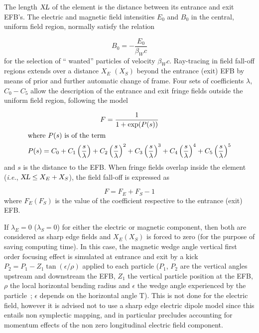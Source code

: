 \noindent The length $ \textsl{XL} $ of the element is the distance between its
entrance and exit EFB's. The electric and magnetic field intensities $ E_0 $ and $ B_0 $ in the 
central, uniform field region, normally satisfy the relation
 
 $$ B_0= - \dfrac{E_0 }{ \beta_ Wc} $$
%
 for the selection of `` wanted''  particles of velocity $\beta_Wc $. Ray-tracing in 
field fall-off regions extends over a distance $ X_E $ $ (X_S) $ beyond the
entrance (exit) EFB by means of prior and further automatic change of frame. Four sets
of coefficients $\lambda$, $ C_0-C_5 $ allow the description of the entrance and exit fringe 
fields outside the uniform field region, following the model~\cite{Biblio12} %

\begin{gather*}
	F = \dfrac{1 }{ 1+ \exp(P(s))} \\
	\intertext{where $  P(s) $ is of the term}
	    P(s) = C_0
	       +C_1 \left(  \dfrac{s }{ \lambda} \right) 
	       +C_2 \left( \dfrac{s }{ \lambda} \right)^2 
	       + C_3 \left( \dfrac{s }{ \lambda} \right)^3 
	       +C_4 \left( \dfrac{s }{ \lambda} \right)^4 
	       + C_5 \left(\dfrac{s }{ \lambda} \right)^5 
\end{gather*}
%
and $ s $ is the distance to the EFB.  When fringe fields overlap
inside the element (\emph{i.e.}, $ \textsl{XL}\leq X_E+X_S$),  the field fall-off is expressed as

$$ F = F_E + F_S -1 $$
%
 where $ F_E(F_S) $ is the value of the coefficient respective to the entrance (exit) EFB. 
 
\noindent If $ \lambda_ E=0 $  ($\lambda_ S=0$)  for either the electric or
magnetic component, then both are considered as sharp edge fields and $ X_E(X_S) $ is forced 
to zero (for the purpose of saving computing time).  In this case, the magnetic wedge angle vertical first order focusing effect is simulated at entrance and exit by a kick $P_2 = P_1 - Z_1 \tan (\epsilon / \rho)$ applied to each particle ($P_1$, $P_2$ are the vertical angles upstream and downstream the EFB, $Z_1$ the vertical particle position at the EFB, $\rho$ the local horizontal bending radius and $\epsilon$ the wedge angle experienced by the particle~; $\epsilon$ depends on the horizontal angle T). This is not done for the electric field, however it is advised not to use a sharp edge electric dipole model since this entails non symplectic mapping, and in particular precludes accounting for momentum effects of the non zero longitudinal electric field component.

